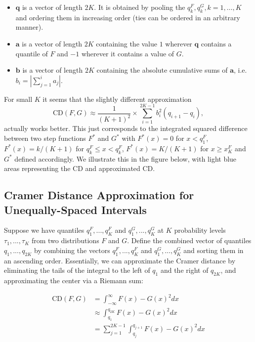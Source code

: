 \documentclass[
]{article}
\providecommand{\tightlist}{%
  \setlength{\itemsep}{0pt}\setlength{\parskip}{0pt}}
\begin{document}
\begin{itemize}
\tightlist
\item
  \(\mathbf{q}\) is a vector of length \(2K\). It is obtained by pooling
  the \(q^F_k, q^G_k, k = 1, \dots, K\) and ordering them in increasing
  order (ties can be ordered in an arbitrary manner).
\item
  \(\mathbf{a}\) is a vector of length \(2K\) containing the value \(1\)
  wherever \(\mathbf{q}\) contains a quantile of \(F\) and \(-1\)
  wherever it contains a value of \(G\).
\item
  \(\mathbf{b}\) is a vector of length \(2K\) containing the absolute
  cumulative sums of \(\mathbf{a}\),
  i.e.~\(b_i = \left|\sum_{j = 1}^i a_j\right|\).
\end{itemize}

For small \(K\) it seems that the slightly different approximation
\begin{equation}
\text{CD}(F, G) \approx \frac{1}{(K + 1)^2} \times \sum_{i = 1}^{2K - 1} b_i^2(q_{i + 1} - q_i),\label{eq:approx2}
\end{equation} actually works better. This just corresponds to the
integrated squared difference between two step functions \(F^*\) and
\(G^*\) with \(F^*(x) = 0\) for \(x < q^F_1\), \(F^*(x) = k/(K + 1)\)
for \(q^F_k \leq x < q^F_k\), \(F^*(x) = K/(K + 1)\) for
\(x \geq x^F_K\) and \(G^*\) defined accordingly. We illustrate this in
the figure below, with light blue areas representing the CD and
approximated CD.

\hypertarget{cramer-distance-approximation-for-unequally-spaced-intervals}{%
\subsection{Cramer Distance Approximation for Unequally-Spaced
Intervals}\label{cramer-distance-approximation-for-unequally-spaced-intervals}}

Suppose we have quantiles \(q_{1}^F,...,q_{K}^F\) and
\(q_{1}^G,...,q_{K}^G\) at \(K\) probability levels
\(\tau_1,...,\tau_K\) from two distributions \(F\) and \(G\). Define the
combined vector of quantiles \(q_1, . . . , q_{2K}\) by combining the
vectors \(q_{1}^F,...,q_{K}^F\) and \(q_{1}^G,...,q_{K}^G\) and sorting
them in an ascending order. Essentially, we can approximate the Cramer
distance by eliminating the tails of the integral to the left of \(q_1\)
and the right of \(q_{2K}\), and approximating the center via a Riemann
sum:

\begin{align}
\text{CD}(F,G) &=\int^\infty_{-\infty}{F(x)−G(x)}^2dx\\
&\approx \int^{q_{2K}}_{q_1}{F(x)−G(x)}^2dx\\
&=\sum^{2K-1}_{j=1}\int^{q_{j+1}}_{q_j}{F(x)−G(x)}^2dx
\end{align}
\end{document}
